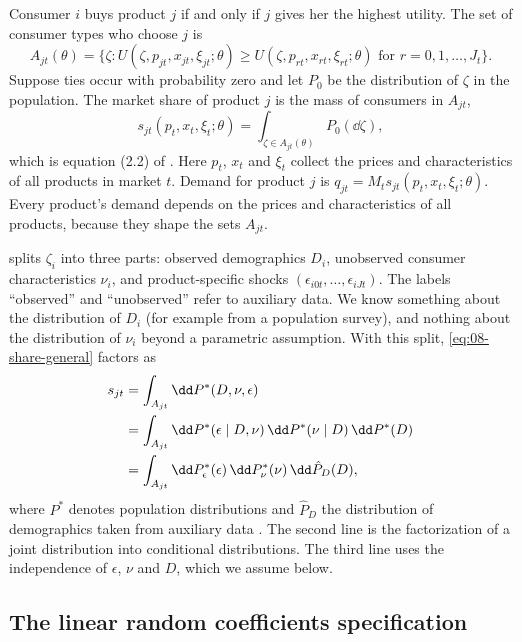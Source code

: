 Consumer $i$ buys product $j$ if and only if $j$ gives her the highest utility. The set of consumer types who
choose $j$ is
\begin{equation}\label{eq:08-choice-set}
  A_{jt}(\theta) = \bigl\{\zeta : U(\zeta, p_{jt}, x_{jt}, \xi_{jt}; \theta) \ge
    U(\zeta, p_{rt}, x_{rt}, \xi_{rt}; \theta) \text{ for } r = 0, 1, \dots, J_t\bigr\}.
\end{equation}
Suppose ties occur with probability zero and let $P_0$ be the distribution of $\zeta$ in the population. The
market share of product $j$ is the mass of consumers in $A_{jt}$,
\begin{equation}\label{eq:08-share-general}
  s_{jt}(p_t, x_t, \xi_t; \theta) = \int_{\zeta \in A_{jt}(\theta)} P_0(\dd\zeta),
\end{equation}
which is equation (2.2) of \citet[p.~845]{BerryLevinsohnPakes1995}. Here $p_t$, $x_t$ and $\xi_t$ collect the
prices and characteristics of all products in market $t$. Demand for product $j$ is $q_{jt} = M_t
s_{jt}(p_t, x_t, \xi_t; \theta)$. Every product's demand depends on the prices and characteristics of all
products, because they shape the sets $A_{jt}$.

\citet[p.~521]{Nevo2000a} splits $\zeta_i$ into three parts: observed demographics $D_i$, unobserved
consumer characteristics $\nu_i$, and product-specific shocks $(\epsilon_{i0t}, \dots, \epsilon_{iJt})$. The
labels ``observed'' and ``unobserved'' refer to auxiliary data. We know something about the distribution of
$D_i$ (for example from a population survey), and nothing about the distribution of $\nu_i$ beyond a
parametric assumption. With this split, \eqref{eq:08-share-general} factors as
\begin{align}
  s_{jt} &= \int_{A_{jt}} \dd P^*(D, \nu, \epsilon) \notag\\
         &= \int_{A_{jt}} \dd P^*(\epsilon \mid D, \nu)\, \dd P^*(\nu \mid D)\, \dd P^*(D) \notag\\
         &= \int_{A_{jt}} \dd P^*_\epsilon(\epsilon)\, \dd P^*_\nu(\nu)\, \dd \hat P_D(D),
  \label{eq:08-share-bayes}
\end{align}
where $P^*$ denotes population distributions and $\hat P_D$ the distribution of demographics taken from
auxiliary data \citep[eq.~(4)]{Nevo2000a}. The second line is the factorization of a joint distribution into
conditional distributions. The third line uses the independence of $\epsilon$, $\nu$ and $D$, which we assume
below.

\subsection{The linear random coefficients specification}\label{sec:08-linear}

